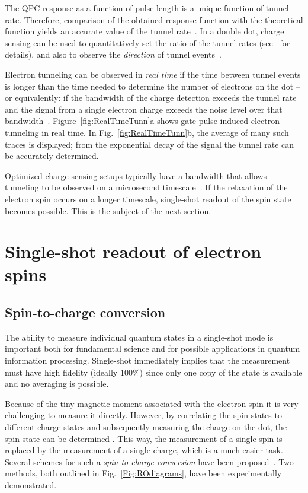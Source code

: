 \documentclass[rmp,twocolumn,aps]{revtex4}
\begin{document}
The QPC response as a function of pulse length is a unique function of tunnel rate. Therefore, comparison of the obtained response function with the theoretical function yields an accurate value of the tunnel rate~\cite{ElzermanAPL2004,HansonThesis2005}. In a double dot, charge sensing can be used to quantitatively set the ratio of the tunnel rates (see~\textcite{JohnsonSpinBlock} for details), and also to observe the \textit{direction} of tunnel events~\cite{FujisawaScience2006}.

Electron tunneling can be observed in \textit{real time} if the
time between tunnel events is longer than the time needed to
determine the number of electrons on the dot -- or equivalently:
if the bandwidth of the charge detection exceeds the tunnel rate and the signal from a single electron charge exceeds the noise level over that bandwidth~\cite{Schoelkopf_rfSET,Lu03a}. Figure~\ref{fig:RealTimeTunn}a
shows gate-pulse-induced electron tunneling in real time. In
Fig.~\ref{fig:RealTimeTunn}b, the average of many such traces is
displayed; from the exponential decay of the signal the tunnel
rate can be accurately determined.

Optimized charge sensing setups typically have a bandwidth that
allows tunneling to be observed on a microsecond
timescale~\cite{Lu03a,Fujisawa04a,VandersypenAPL2004,Schleser04}. If the
relaxation of the electron spin occurs on a longer timescale,
single-shot readout of the spin state becomes possible. This is
the subject of the next section.

\section{Single-shot readout of electron spins}
\label{Section:Readout}
\subsection{Spin-to-charge conversion}

The ability to measure individual quantum states in a single-shot mode is important both for fundamental science and for possible applications in quantum information processing. Single-shot immediately implies that the measurement must have high fidelity (ideally $100 \%$) since only one copy of the state is available and no averaging is possible. 

Because of the tiny magnetic moment associated with the electron spin it is very challenging to measure it directly. However, by correlating the spin states to different charge states and subsequently measuring the charge on
the dot, the spin state can be determined \cite{LossDiVincenzo}.
This way, the measurement of a single spin is replaced by the
measurement of a single charge, which is a much easier task.
Several schemes for  such a \textit{spin-to-charge conversion}
have been
proposed~\cite{LossDiVincenzo,KaneNature1998,VandersypenMQC2002,FriesenPRL2004,EngelPRL2004,IonicioiuNJP2005,GreentreePRB2005}.
Two methods, both outlined in Fig.~\ref{Fig:ROdiagrams}, have been
experimentally demonstrated.
\end{document}
